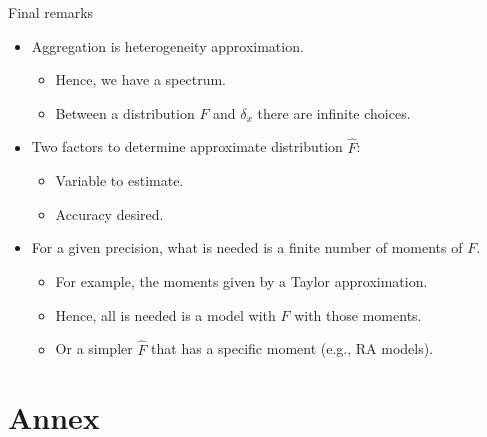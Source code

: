 \documentclass[10pt, handout]{beamer}
\begin{document}
\begin{frame}{Final remarks}
	\vfill
	\begin{itemize}
		\item Aggregation is heterogeneity approximation.\vspace{1ex}
			\begin{itemize}
				\item Hence, we have a spectrum.\vspace{1ex}
				\item Between a distribution $F$ and $\delta_{x}$ there are infinite choices.
			\end{itemize} \vfill

		\item Two factors to determine approximate distribution $\widehat{F}$:\vspace{1ex}
			\begin{itemize}
				\item Variable to estimate.\vspace{1ex}
				\item Accuracy desired.
			\end{itemize} \vfill

		\item For a given precision, what is needed is a finite number of moments of $F$.\vspace{1ex}
			\begin{itemize}
				\item For example, the moments given by a Taylor approximation.\vspace{1ex}
				\item Hence, all is needed is a model with $\widehat{F}$ with those moments.\vspace{1ex}
				\item Or a simpler $\widehat{F}$ that has a specific moment (e.g., RA models).
			\end{itemize}
	\end{itemize} \vfill

\end{frame}


\begin{frame}
  \titlepage
 \end{frame}

\section*{Annex}
\end{document}
